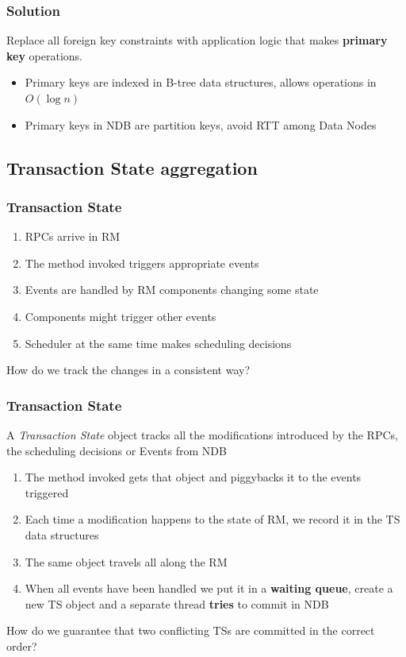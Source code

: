 \documentclass{beamer}
\begin{document}
\begin{frame}
\frametitle{Solution}
Replace all foreign key constraints with application logic that makes
\textbf{primary key} operations.

\begin{itemize}
\item<+-> Primary keys are indexed in B-tree data structures, allows
  operations in $O(\log{}n)$
\item<+-> Primary keys in NDB are partition keys, avoid RTT among Data
  Nodes
\end{itemize}
\end{frame}

\subsection{Transaction State aggregation}
\begin{frame}
\frametitle{Transaction State}

\begin{enumerate}
\item RPCs arrive in RM
\item The method invoked triggers appropriate events
\item Events are handled by RM components changing some state
\item Components might trigger other events
\item Scheduler at the same time makes scheduling decisions
\end{enumerate}

\pause
\vfill
\centering
{\color{red} How do we track the changes in a consistent way?}
\end{frame}

\begin{frame}
\frametitle{Transaction State}
A \emph{Transaction State} object tracks all the modifications
introduced by the RPCs, the scheduling decisions or Events from NDB

\begin{enumerate}
\item The method invoked gets that object and piggybacks it to the
  events triggered
\item Each time a modification happens to the state of RM, we record
  it in the TS data structures
\item The same object travels all along the RM
\item When all events have been handled we put it in a \textbf{waiting
    queue}, create a new TS object and a separate thread \textbf{tries} to commit in NDB
\end{enumerate}

\pause
\vfill
\centering
{\color{red} How do we guarantee that two conflicting TSs are
  committed in the correct order?}
\end{frame}
\end{document}
